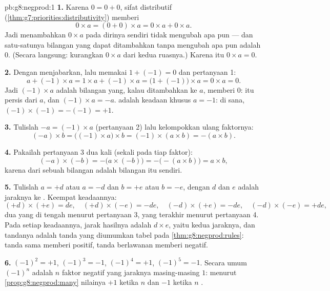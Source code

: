 \begin{solution}{pb:g8:negprod:1}
\textbf{1.} Karena $0 = 0 + 0$, sifat distributif
(\cref{thm:g7:priorities:distributivity}) memberi
\[
0 \times a = (0 + 0) \times a = 0 \times a + 0 \times a .
\]
Jadi menambahkan $0 \times a$ pada dirinya sendiri tidak mengubah apa
pun --- dan satu-satunya bilangan yang dapat ditambahkan tanpa
mengubah apa pun adalah $0$. (Secara langsung: kurangkan
$0 \times a$ dari kedua ruasnya.) Karena itu $0 \times a = 0$.

\textbf{2.} Dengan menjabarkan, lalu memakai $1 + (-1) = 0$ dan pertanyaan 1:
\[
a + (-1) \times a
= 1 \times a + (-1) \times a
= \bigl(1 + (-1)\bigr) \times a
= 0 \times a = 0 .
\]
Jadi $(-1) \times a$ adalah bilangan yang, kalau ditambahkan ke $a$,
memberi $0$: itu persis  dari $a$, dan $(-1) \times a = -a$.
 adalah keadaan khusus $a = -1$: di sana,
$(-1) \times (-1) = -(-1) = +1$.

\textbf{3.} Tulislah $-a = (-1) \times a$ (pertanyaan 2) lalu
kelompokkan ulang faktornya:
\[
(-a) \times b
= \bigl((-1) \times a\bigr) \times b
= (-1) \times (a \times b)
= -(a \times b) .
\]

\textbf{4.} Pakailah pertanyaan 3 dua kali (sekali pada tiap faktor):
\[
(-a) \times (-b)
= -\bigl(a \times (-b)\bigr)
= -\bigl(-(a \times b)\bigr)
= a \times b ,
\]
karena  dari  sebuah bilangan adalah bilangan itu sendiri.

\textbf{5.} Tulislah $a = +d$ atau $a = -d$ dan $b = +e$ atau
$b = -e$, dengan $d$ dan $e$ adalah jaraknya ke . Keempat keadaannya:
\[
(+d) \times (+e) = de, \quad
(+d) \times (-e) = -de, \quad
(-d) \times (+e) = -de, \quad
(-d) \times (-e) = +de,
\]
dua yang di tengah menurut pertanyaan 3, yang terakhir menurut
pertanyaan 4. Pada setiap keadaannya, jarak hasilnya adalah
$d \times e$, yaitu  kedua jaraknya, dan tandanya adalah
tanda yang diumumkan tabel pada
\cref{thm:g8:negprod:rules}: tanda sama memberi positif, tanda
berlawanan memberi negatif.

\textbf{6.} $(-1)^2 = +1$, $(-1)^3 = -1$, $(-1)^4 = +1$,
$(-1)^5 = -1$. Secara umum $(-1)^n$ adalah  $n$ faktor
negatif yang jaraknya masing-masing $1$: menurut
\cref{prop:g8:negprod:many} nilainya
$+1$ ketika $n$  dan $-1$ ketika $n$ .


\end{solution}
